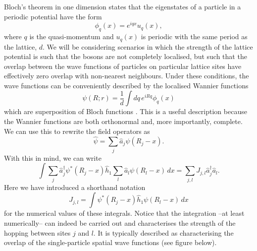 \documentclass[a4paper, 10pt]{article}
\theoremstyle{plain}
\begin{document}
Bloch's theorem in one dimension states \cite{Bloch1929, Kittel1987} that the
eigenstates of a particle in a periodic potential have the form
\begin{equation}
    \phi_{q}(x) = e^{iqx} u_{q}(x),
\end{equation}
where $q$ is the quasi-momentum and $u_{q}(x)$ is periodic with the same period
as the lattice, $d$. We will be considering scenarios in which the strength of
the lattice potential is such that the bosons are not completely localised, but
such that the overlap between the wave functions of particles on particular
lattice sites have effectively zero overlap with non-nearest neighbours. Under
these conditions, the wave functions can be conveniently described by the
localised Wannier functions
\begin{equation}
    \psi(R;r) = \frac{1}{d} \int{dq\, e^{iRq} \phi_{q}(x)}
\end{equation}
which are superposition of Bloch functions \cite{Kittel1987, Wannier1937}. This
is a useful description because the Wannier functions are both orthonormal and,
more importantly, complete. We can use this to rewrite the field operators as
\begin{equation}
    \label{field_operators_wannier}
    \hat{\psi} = \sum_{j}{\hat{a}_{j}\psi(R_{j} - x)}.
\end{equation}
With this in mind, we can write
\begin{equation}
    \int{
         \sum_{j}{\hat{a}_j^{\dagger}\psi^{*}(R_j-x)}
         \hat{h}_{1}
         \sum_{l}{\hat{a}_l\psi(R_{l} - x)}
         \,dx}
    =
    \sum_{j,l}{J_{j,l} \hat{a}_{j}^{\dagger} \hat{a}_{l}}.
\end{equation}
Here we have introduced a shorthand notation
\begin{equation}
    J_{j,l} = \int{\psi^{*}(R_{j} - x) \hat{h}_{1} \psi(R_{l} - x) \,dx}
\end{equation}
for the numerical values of these integrals. Notice that the integration --at
least numerically-- can indeed be carried out and characterises the strength of
the hopping between sites $j$ and $l$. It is typically described
\cite{Altland2010,Kittel1987} as characterising the overlap of the
single-particle spatial wave functions (see figure below).
\end{document}
